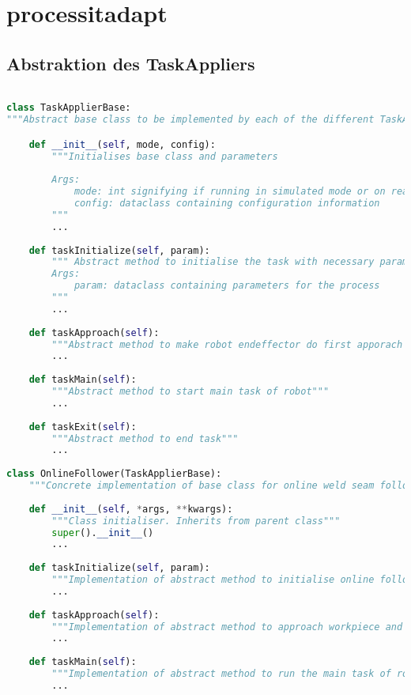 
\section{processit\textunderscore adapt}
\subsection{Abstraktion des TaskAppliers}
\begin{lstlisting}[language=Python, columns=fullflexible, frame=single, breaklines=true, postbreak=\mbox{\textcolor{red}{$\hookrightarrow$}\space}]

class TaskApplierBase:
"""Abstract base class to be implemented by each of the different TaskAppliers"""

	def __init__(self, mode, config):
		"""Initialises base class and parameters
		
		Args:
			mode: int signifying if running in simulated mode or on real hardware
			config: dataclass containing configuration information
		"""
		...
		
	def taskInitialize(self, param):
		""" Abstract method to initialise the task with necessary parameters
		Args:
			param: dataclass containing parameters for the process
		"""
		...
		
	def taskApproach(self):
		"""Abstract method to make robot endeffector do first apporach to workpiece"""
		...
		
	def taskMain(self):
		"""Abstract method to start main task of robot"""
		...
		
	def taskExit(self):
		"""Abstract method to end task"""
		...
		
class OnlineFollower(TaskApplierBase):
	"""Concrete implementation of base class for online weld seam following"""
	
	def __init__(self, *args, **kwargs):
		"""Class initialiser. Inherits from parent class"""
		super().__init__()
		...
		
	def taskInitialize(self, param):
		"""Implementation of abstract method to initialise online following task with process parameters"""
		...
		
	def taskApproach(self):
		"""Implementation of abstract method to approach workpiece and do initial measurement scan of weld seam"""
		...
		
	def taskMain(self):
		"""Implementation of abstract method to run the main task of robot while recognising contour of weld seam online"""
		...
		

\end{lstlisting}
